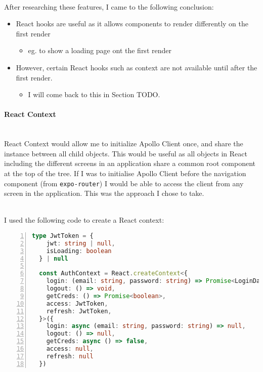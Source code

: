 \documentclass[../../main.tex]{subfiles}
\begin{document}
\noindent \\ After researching these features, I came to the following conclusion:

\begin{itemize}
  \item React hooks are useful as it allows components to render differently on the first render
        \begin{itemize}
          \item eg. to show a loading page ont the first render
        \end{itemize}
  \item However, certain React hooks such as context are not
        available until after the first render.
        \begin{itemize}
          \item I will come back to this in Section TODO.
        \end{itemize}
\end{itemize}

\paragraph{React Context\\}

\noindent \\ React Context would allow me to initialize Apollo Client once,
and share the instance between all child objects. This would be useful as
all objects in React including the different screens in an application share a common
root component at the top of the tree. If I was to initialise Apollo Client
before the navigation component (from \lstinline{expo-router}) I would be able to access
the client from any screen in the application. This was the approach I chose to take.

\noindent \\ I used the following code to create a React context:

\begin{lstlisting}[language=typescript, numbers=left, framesep=6pt]
  type JwtToken = {
    jwt: string | null,
    isLoading: boolean
  } | null

  const AuthContext = React.createContext<{
    login: (email: string, password: string) => Promise<LoginData | null | undefined>,
    logout: () => void,
    getCreds: () => Promise<boolean>,
    access: JwtToken,
    refresh: JwtToken,
  }>({
    login: async (email: string, password: string) => null,
    logout: () => null,
    getCreds: async () => false,
    access: null,
    refresh: null
  })
\end{lstlisting}
\end{document}
